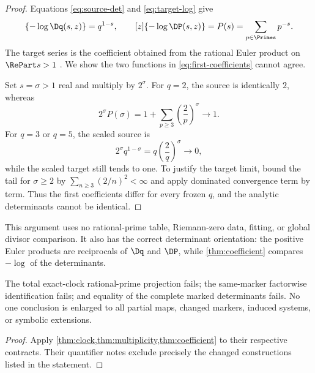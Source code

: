 \begin{proof}
Equations \eqref{eq:source-det} and \eqref{eq:target-log} give
\begin{equation}
 [z]\{-\log\Dq(s,z)\}=q^{1-s},
 \qquad
 [z]\{-\log\DP(s,z)\}=P(s)=\sum_{p\in\Primes}p^{-s}.         \label{eq:first-coefficients}
\end{equation}
The target series is the coefficient obtained from the rational Euler product
on $\RePart s>1$ \citep{nistDLMF25211}. We show the two functions in
\cref{eq:first-coefficients} cannot agree.

Set $s=\sigma>1$ real and multiply by $2^\sigma$. For $q=2$, the source is
identically $2$, whereas
\[
 2^\sigma P(\sigma)
 =1+\sum_{p\ge3}\left(\frac2p\right)^\sigma\longrightarrow1.
\]
For $q=3$ or $q=5$, the scaled source is
\[
 2^\sigma q^{1-\sigma}=q\left(\frac2q\right)^\sigma
 \longrightarrow0,
\]
while the scaled target still tends to one. To justify the target limit,
bound the tail for $\sigma\ge2$ by
$\sum_{n\ge3}(2/n)^2<\infty$ and apply dominated convergence term by term.
Thus the first coefficients differ for every frozen $q$, and the analytic
determinants cannot be identical.
\end{proof}

This argument uses no rational-prime table, Riemann-zero data, fitting, or
global divisor comparison. It also has the correct determinant orientation:
the positive Euler products are reciprocals of $\Dq$ and $\DP$, while
\cref{thm:coefficient} compares $-\log$ of the determinants.

\begin{corollary}
\label{cor:closures}
The total exact-clock rational-prime projection fails; the same-marker
factorwise identification fails; and equality of the complete marked
determinants fails. No one conclusion is enlarged to all partial maps,
changed markers, induced systems, or symbolic extensions.
\end{corollary}

\begin{proof}
Apply \cref{thm:clock,thm:multiplicity,thm:coefficient} to their respective
contracts. Their quantifier notes exclude precisely the changed constructions
listed in the statement.
\end{proof}
